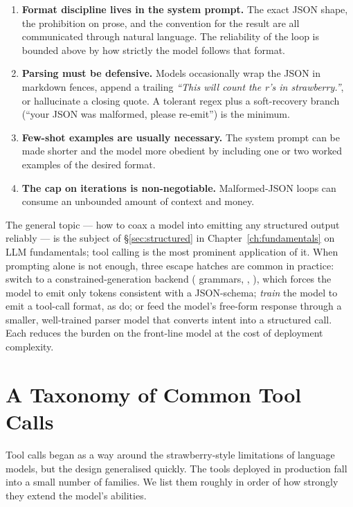 \begin{enumerate}[label=(\arabic*)]
\item \textbf{Format discipline lives in the system prompt.} The
  exact JSON shape, the prohibition on prose, and the convention for
  the result are all communicated through natural language. The
  reliability of the loop is bounded above by how strictly the model
  follows that format.
\item \textbf{Parsing must be defensive.} Models occasionally wrap
  the JSON in markdown fences, append a trailing
  \emph{``This will count the r's in strawberry.''}, or hallucinate a
  closing quote. A tolerant regex plus a soft-recovery branch (``your
  JSON was malformed, please re-emit'') is the minimum.
\item \textbf{Few-shot examples are usually necessary.} The system
  prompt can be made shorter and the model more obedient by including
  one or two worked examples of the desired format.
\item \textbf{The cap on iterations is non-negotiable.} Malformed-JSON
  loops can consume an unbounded amount of context and money.
\end{enumerate}

The general topic --- how to coax a model into emitting any
structured output reliably --- is the subject of
\S\ref{sec:structured} in Chapter~\ref{ch:fundamentals} on LLM
fundamentals; tool calling is the most prominent application of it.
When prompting alone is not enough, three escape hatches are common
in practice: switch to a constrained-generation backend
( grammars, ,
), which forces the model to emit only
tokens consistent with a JSON-schema; \emph{train} the model to emit
a tool-call format, as \citet{schick2023toolformer} do; or feed the
model's free-form response through a smaller, well-trained parser
model that converts intent into a structured call. Each reduces the
burden on the front-line model at the cost of deployment complexity.

\section{A Taxonomy of Common Tool Calls}
\label{sec:taxonomy}

Tool calls began as a way around the strawberry-style limitations of
language models, but the design generalised quickly. The tools
deployed in production fall into a small number of families. We list
them roughly in order of how strongly they extend the model's
abilities.

